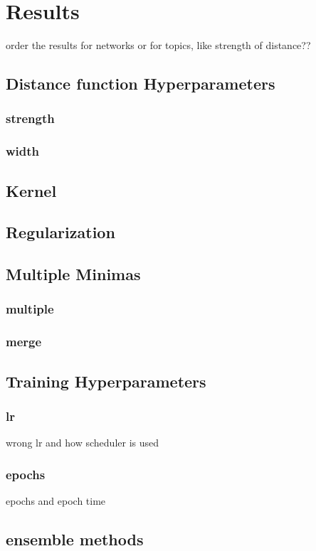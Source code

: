 \chapter{Results}
order the results for networks or for topics, like strength of distance??

\section{Distance function Hyperparameters}
\subsection{strength}
\subsection{width}

\section{Kernel}

\section{Regularization}

\section{Multiple Minimas}
\subsection{multiple}
\subsection{merge}

\section{Training Hyperparameters}
\subsection{lr}
wrong lr and how scheduler is used
\subsection{epochs}
epochs and epoch time

\section{ensemble methods}
